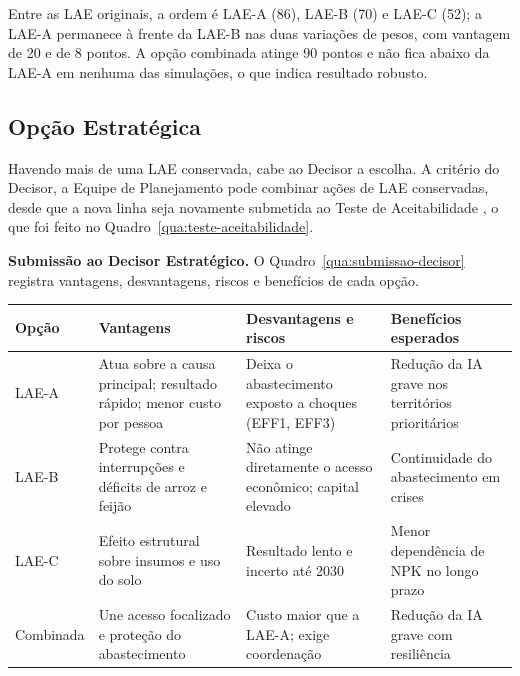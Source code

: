 \documentclass[
	12pt,				%
	openright,			%
	oneside,			%
	a4paper,			%
	chapter=TITLE,		%
	section=TITLE,		%
	english,			%
	french,				%
	spanish,			%
	brazil,				%
 ]{abntex2}
\begin{document}
Entre as LAE originais, a ordem é LAE-A (86), LAE-B (70) e LAE-C (52); a
LAE-A permanece à frente da LAE-B nas duas variações de pesos, com vantagem de
20 e de 8 pontos. A opção combinada atinge 90 pontos e não fica abaixo da LAE-A em nenhuma
das simulações, o que indica resultado robusto.

\subsection{Opção Estratégica}
Havendo mais de uma LAE conservada, cabe ao Decisor a escolha. A critério do Decisor, a Equipe de Planejamento
pode combinar ações de LAE conservadas, desde que a nova linha seja novamente
submetida ao Teste de Aceitabilidade \cite[p. 122]{esg_mpe2026}, o que foi feito
no Quadro~\ref{qua:teste-aceitabilidade}.

\textbf{Submissão ao Decisor Estratégico.} O Quadro~\ref{qua:submissao-decisor}
registra vantagens, desvantagens, riscos e benefícios de cada opção.

\begin{quadro}[!htbp]
\centering
\caption{Submissão das opções ao Decisor Estratégico}
\label{qua:submissao-decisor}
\footnotesize
\renewcommand{\arraystretch}{1.05}
\setlength{\tabcolsep}{3pt}
\begin{tabularx}{\textwidth}{|>{\raggedright\arraybackslash}p{1.6cm}|>{\raggedright\arraybackslash}X|>{\raggedright\arraybackslash}X|>{\raggedright\arraybackslash}X|}
\hline
\textbf{Opção} & \textbf{Vantagens} & \textbf{Desvantagens e riscos} & \textbf{Benefícios esperados} \\
\hline
LAE-A & Atua sobre a causa principal; resultado rápido; menor custo por pessoa & Deixa o abastecimento exposto a choques (EFF1, EFF3) & Redução da IA grave nos territórios prioritários \\
\hline
LAE-B & Protege contra interrupções e déficits de arroz e feijão & Não atinge diretamente o acesso econômico; capital elevado & Continuidade do abastecimento em crises \\
\hline
LAE-C & Efeito estrutural sobre insumos e uso do solo & Resultado lento e incerto até 2030 & Menor dependência de NPK no longo prazo \\
\hline
Combinada & Une acesso focalizado e proteção do abastecimento & Custo maior que a LAE-A; exige coordenação & Redução da IA grave com resiliência \\
\hline
\end{tabularx}
\end{quadro}
\end{document}
